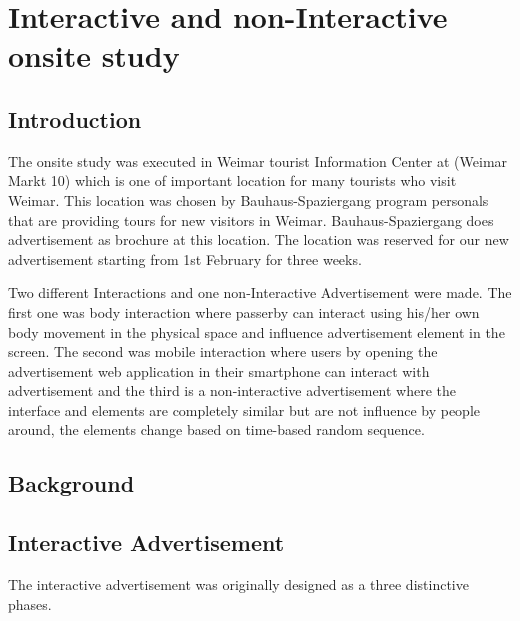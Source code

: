 \chapter{Interactive and non-Interactive onsite study} %

\label{Chapter8} %

\section{Introduction}




The onsite study was executed in Weimar tourist Information Center at (Weimar Markt 10) which is one of important location for many tourists who visit Weimar. This location was chosen by Bauhaus-Spaziergang program personals that are providing tours for new visitors in Weimar. Bauhaus-Spaziergang does advertisement as brochure at this location. The location was reserved for our new advertisement starting from 1st February for three weeks. 

Two different Interactions and one non-Interactive Advertisement were made. The first one was body interaction where passerby can interact using his/her own body movement in the physical space and influence advertisement element in the screen. The second was mobile interaction where users by opening the advertisement web application in their smartphone can interact with advertisement and the third is a non-interactive advertisement where the interface and elements are completely similar but are not influence by people around, the elements change based on time-based random sequence. 



\section{Background}



\section{Interactive Advertisement}

The interactive advertisement was originally designed as a three distinctive phases.


